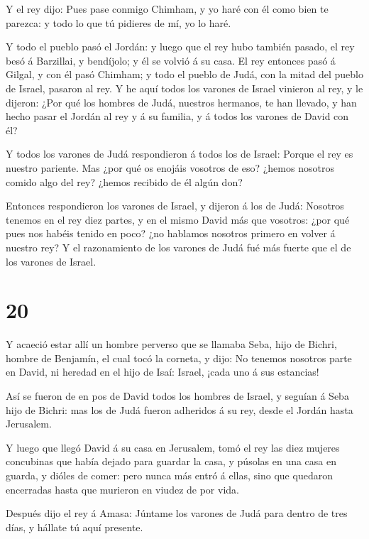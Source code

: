  Y el rey dijo: Pues pase conmigo Chimham, y yo haré con él
como bien te parezca: y todo lo que tú pidieres de mí, yo lo haré.

 Y todo el pueblo pasó el Jordán: y luego que el rey hubo
también pasado, el rey besó á Barzillai, y bendíjolo; y él se volvió á
su casa.  El rey entonces pasó á Gilgal, y con él pasó
Chimham; y todo el pueblo de Judá, con la mitad del pueblo de Israel,
pasaron al rey.  Y he aquí todos los varones de Israel
vinieron al rey, y le dijeron: ¿Por qué los hombres de Judá, nuestros
hermanos, te han llevado, y han hecho pasar el Jordán al rey y á su
familia, y á todos los varones de David con él?

 Y todos los varones de Judá respondieron á todos los de
Israel: Porque el rey es nuestro pariente. Mas ¿por qué os enojáis
vosotros de eso? ¿hemos nosotros comido algo del rey? ¿hemos recibido de
él algún don?

 Entonces respondieron los varones de Israel, y dijeron á
los de Judá: Nosotros tenemos en el rey diez partes, y en el mismo David
más que vosotros: ¿por qué pues nos habéis tenido en poco? ¿no hablamos
nosotros primero en volver á nuestro rey? Y el razonamiento de los
varones de Judá fué más fuerte que el de los varones de Israel.

\hypertarget{section-19}{%
\section{20}\label{section-19}}

 Y acaeció estar allí un hombre perverso que se llamaba
Seba, hijo de Bichri, hombre de Benjamín, el cual tocó la corneta, y
dijo: No tenemos nosotros parte en David, ni heredad en el hijo de Isaí:
Israel, ¡cada uno á sus estancias!

 Así se fueron de en pos de David todos los hombres de
Israel, y seguían á Seba hijo de Bichri: mas los de Judá fueron
adheridos á su rey, desde el Jordán hasta Jerusalem.

 Y luego que llegó David á su casa en Jerusalem, tomó el rey
las diez mujeres concubinas que había dejado para guardar la casa, y
púsolas en una casa en guarda, y dióles de comer: pero nunca más entró á
ellas, sino que quedaron encerradas hasta que murieron en viudez de por
vida.

 Después dijo el rey á Amasa: Júntame los varones de Judá
para dentro de tres días, y hállate tú aquí presente.

